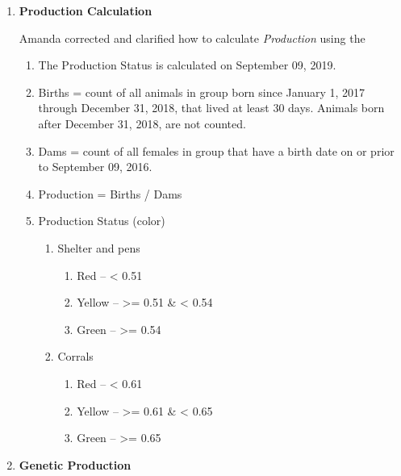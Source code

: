 \documentclass[
]{article}
\providecommand{\tightlist}{%
  \setlength{\itemsep}{0pt}\setlength{\parskip}{0pt}}
\begin{document}
\begin{enumerate}
\def\labelenumi{\arabic{enumi}.}
\item
  \textbf{Production Calculation}

  Amanda corrected and clarified how to calculate \emph{Production}
  using the

  \begin{enumerate}
  \def\labelenumii{\alph{enumii}.}
  \tightlist
  \item
    The Production Status is calculated on September 09, 2019.
  \item
    Births = count of all animals in group born since January 1, 2017
    through December 31, 2018, that lived at least 30 days. Animals born
    after December 31, 2018, are not counted.
  \item
    Dams = count of all females in group that have a birth date on or
    prior to September 09, 2016.
  \item
    Production = Births / Dams
  \item
    Production Status (color)

    \begin{enumerate}
    \def\labelenumiii{\arabic{enumiii}.}
    \tightlist
    \item
      Shelter and pens

      \begin{enumerate}
      \def\labelenumiv{\arabic{enumiv}.}
      \tightlist
      \item
        Red -- \textless{} 0.51
      \item
        Yellow -- \textgreater= 0.51 \& \textless{} 0.54
      \item
        Green -- \textgreater= 0.54
      \end{enumerate}
    \item
      Corrals

      \begin{enumerate}
      \def\labelenumiv{\arabic{enumiv}.}
      \tightlist
      \item
        Red -- \textless{} 0.61
      \item
        Yellow -- \textgreater= 0.61 \& \textless{} 0.65
      \item
        Green -- \textgreater= 0.65
      \end{enumerate}
    \end{enumerate}
  \end{enumerate}
\item
  \textbf{Genetic Production}


\end{enumerate}
\end{document}
